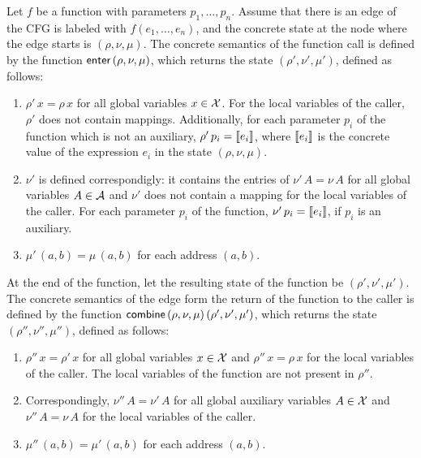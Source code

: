 Let $f$ be a function with parameters $p_1, \ldots, p_n$.
Assume that there is an edge of the CFG is labeled with $f(e_1, \ldots, e_n)$,
and the concrete state at the node where the edge starts is $(\rho, \nu, \mu)$.
The concrete semantics of the
function call is defined by the function $\textsf{enter}\,(\rho, \nu, \mu)$, which returns the state $(\rho', \nu', \mu')$, defined as follows:
\begin{enumerate}
    \item $\rho'\,x = \rho\,x$ for all global variables $x \in \mathcal{X}$.
    For the local variables of the caller, $\rho'$ does not contain mappings.
          Additionally, for each parameter $p_i$ of the function which is not an auxiliary, $\rho'\,p_i = \llbracket e_i\rrbracket$, where $\llbracket e_i\rrbracket$ is the concrete value of the expression $e_i$ in the state $(\rho, \nu, \mu)$.
    \item $\nu'$ is defined correspondigly: it contains the entries of $\nu'\,A = \nu\,A$ for all global variables $A \in \mathcal{A}$ and $\nu'$ does not contain a mapping for the local variables of the caller.
    For each parameter $p_i$ of the function, $\nu'\,p_i=\llbracket e_i\rrbracket$, if $p_i$ is an auxiliary.
    \item $\mu'\,(a,b)=\mu\,(a,b)$ for each address $(a,b)$.
\end{enumerate}

At the end of the function, let the resulting state of the function be $(\rho', \nu', \mu')$.
The concrete semantics of the edge form the return of the function to the caller is defined by the function $\textsf{combine}\,(\rho, \nu, \mu)\,(\rho', \nu', \mu')$, which returns the state $(\rho'', \nu'', \mu'')$, defined as follows:
\begin{enumerate}
    \item $\rho''\,x = \rho'\,x$ for all global variables $x \in \mathcal{X}$ and $\rho''\,x = \rho\,x$ for the local variables of the caller.
    The local variables of the function are not present in $\rho''$.
    \item Correspondingly, $\nu''\,A = \nu'\,A$ for all global auxiliary variables $A \in \mathcal{X}$ and $\nu''\,A = \nu\,A$ for the local variables of the caller.
    \item $\mu''\,(a,b)=\mu'\,(a,b)$ for each address $(a,b)$.
\end{enumerate}
